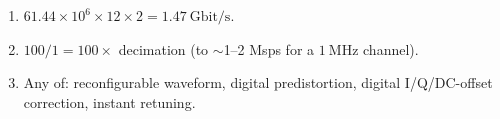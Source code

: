 \begin{enumerate}[leftmargin=1.6em,itemsep=2pt]
\item $61.44\times10^{6}\times12\times2 = 1.47\ \text{Gbit/s}$.
\item $100/1 = 100\times$ decimation (to $\sim$1--2 Msps for a $1\ \text{MHz}$ channel).
\item Any of: reconfigurable waveform, digital predistortion, digital I/Q/DC-offset correction, instant retuning.
\end{enumerate}
